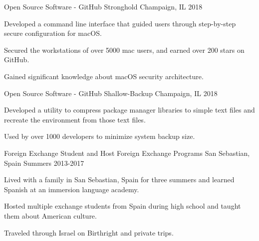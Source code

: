 

\begin{cventries}
\cventry
{Open Source Software - GitHub} %
{Stronghold} %
{Champaign, IL} %
{2018} %
{
	\begin{cvitems} %
		\item {Developed a command line interface that guided users through step-by-step secure configuration for macOS.}
		\item {Secured the workstations of over 5000 mac users, and earned over 200 stars on GitHub.}
		\item{Gained significant knowledge about macOS security architecture.} 
	\end{cvitems}
}
\cventry
{Open Source Software - GitHub} %
{Shallow-Backup} %
{Champaign, IL} %
{2018} %
{
	\begin{cvitems} %
		\item {Developed a utility to compress package manager libraries to simple text files and recreate the environment from those text files.}
		\item {Used by over 1000 developers to minimize system backup size.}
	\end{cvitems}
} 
\cventry
{Foreign Exchange Student and Host} %
{Foreign Exchange Programs} %
{San Sebastian, Spain} %
{Summers 2013-2017} %
{
	\begin{cvitems} %
		\item {Lived with a family in San Sebastian, Spain for three summers and learned Spanish at an immersion language academy.}
		\item {Hosted multiple exchange students from Spain during high school and taught them about American culture.}
		\item {Traveled through Israel on Birthright and private trips.}
	\end{cvitems}
}
\end{cventries}
